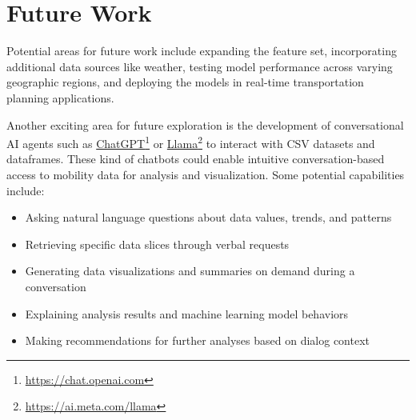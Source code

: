 \section{Future Work}
\label{sec:results:future}

Potential areas for future work include expanding the feature set, incorporating additional data sources like weather, testing model performance across varying geographic regions, and deploying the models in real-time transportation planning applications.

Another exciting area for future exploration is the development of conversational AI agents such as
\href{https://chat.openai.com}{ChatGPT}\footnote{\url{https://chat.openai.com}}
or
\href{https://ai.meta.com/llama}{Llama}\footnote{\url{https://ai.meta.com/llama}}
to interact with CSV datasets and dataframes. 
These kind of chatbots could enable intuitive conversation-based access to mobility data for analysis and visualization. Some potential capabilities include:

\begin{itemize}
	\item Asking natural language questions about data values, trends, and patterns
	\item Retrieving specific data slices through verbal requests
	\item Generating data visualizations and summaries on demand during a conversation
	\item Explaining analysis results and machine learning model behaviors
	\item Making recommendations for further analyses based on dialog context
\end{itemize}
